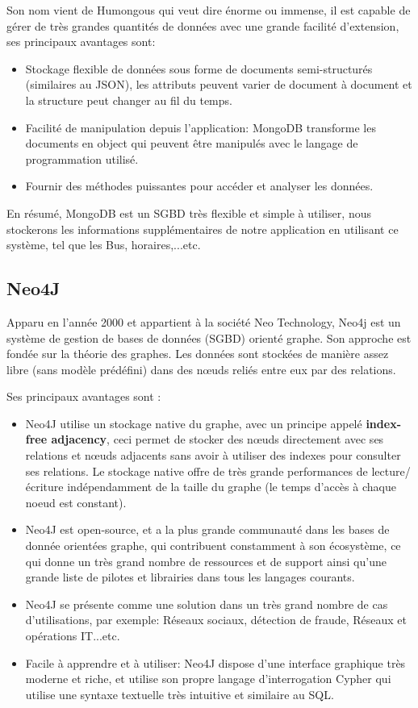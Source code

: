 Son nom vient de Humongous qui veut dire énorme ou immense, il est capable de gérer de très grandes quantités de données avec une grande facilité d'extension, ses principaux avantages sont:

\begin{itemize}
	\item Stockage flexible de données sous forme de documents semi-structurés (similaires au JSON), les attributs peuvent varier de document à document et la structure peut changer au fil du temps.
	\item Facilité de manipulation depuis l'application: MongoDB transforme les documents en object qui peuvent être manipulés avec le langage de programmation utilisé.
	\item Fournir des méthodes puissantes pour accéder et analyser les données.
\end{itemize}

En résumé, MongoDB est un SGBD très flexible et simple à utiliser, nous stockerons les informations supplémentaires de notre application en utilisant ce système, tel que les Bus, horaires,...etc.

\subsection{Neo4J}
Apparu en l'année 2000 et appartient à la société Neo Technology, Neo4j est un système de gestion de bases de données (SGBD) orienté graphe. Son approche est fondée sur la théorie des graphes. Les données sont stockées de manière assez libre (sans modèle prédéfini) dans des nœuds reliés entre eux par des relations.

Ses principaux avantages sont :
\begin{itemize}
	\item Neo4J utilise un stockage native du graphe, avec un principe appelé \textbf{index-free adjacency}, ceci permet de stocker des nœuds directement avec ses relations et nœuds adjacents sans avoir à utiliser des indexes pour consulter ses relations.\newline
	Le stockage native offre de très grande performances de lecture/écriture indépendamment de la taille du graphe (le temps d'accès à chaque noeud est constant).
	\item Neo4J est open-source, et a la plus grande communauté dans les bases de donnée orientées graphe, qui contribuent constamment à son écosystème, ce qui donne un très grand nombre de ressources et de support ainsi qu'une grande liste de pilotes et librairies dans tous les langages courants.
	\item Neo4J se présente comme une solution dans un très grand nombre de cas d'utilisations, par exemple: Réseaux sociaux, détection de fraude, Réseaux et opérations IT...etc.
	\item Facile à apprendre et à utiliser: Neo4J dispose d'une interface graphique très moderne et riche, et utilise son propre langage d'interrogation Cypher qui utilise une syntaxe textuelle très intuitive et similaire au SQL.
\end{itemize}

